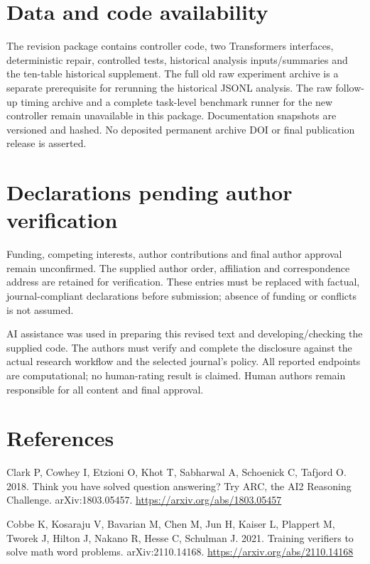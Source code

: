\documentclass[
  12pt,
  a4paper,
]{article}
\begin{document}
\section{Data and code availability}\label{data-and-code-availability}

The revision package contains controller code, two Transformers
interfaces, deterministic repair, controlled tests, historical analysis
inputs/summaries and the ten-table historical supplement. The full old
raw experiment archive is a separate prerequisite for rerunning the
historical JSONL analysis. The raw follow-up timing archive and a
complete task-level benchmark runner for the new controller remain
unavailable in this package. Documentation snapshots are versioned and
hashed. No deposited permanent archive DOI or final publication release
is asserted.

\section{Declarations pending author
verification}\label{declarations-pending-author-verification}

Funding, competing interests, author contributions and final author
approval remain unconfirmed. The supplied author order, affiliation and
correspondence address are retained for verification. These entries must
be replaced with factual, journal-compliant declarations before
submission; absence of funding or conflicts is not assumed.

AI assistance was used in preparing this revised text and
developing/checking the supplied code. The authors must verify and
complete the disclosure against the actual research workflow and the
selected journal's policy. All reported endpoints are computational; no
human-rating result is claimed. Human authors remain responsible for all
content and final approval.

\section{References}\label{references}

Clark P, Cowhey I, Etzioni O, Khot T, Sabharwal A, Schoenick C, Tafjord
O. 2018. Think you have solved question answering? Try ARC, the AI2
Reasoning Challenge. arXiv:1803.05457.
\url{https://arxiv.org/abs/1803.05457}

Cobbe K, Kosaraju V, Bavarian M, Chen M, Jun H, Kaiser L, Plappert M,
Tworek J, Hilton J, Nakano R, Hesse C, Schulman J. 2021. Training
verifiers to solve math word problems. arXiv:2110.14168.
\url{https://arxiv.org/abs/2110.14168}
\end{document}
